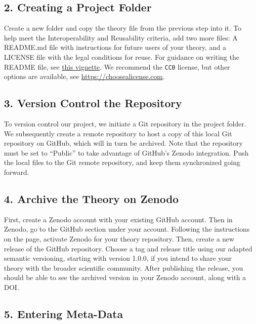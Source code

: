 \documentclass[
  man, noextraspace,floatsintext]{apa6}
\begin{document}
\subsection{2. Creating a Project Folder}\label{creating-a-project-folder}

Create a new folder and copy the theory file from the previous step into it.
To help meet the Interoperability and Reusability criteria,
add two more files:
A README.md file with instructions for future users of your theory,
and a LICENSE file with the legal conditions for reuse.
For guidance on writing the README file, see \href{https://cjvanlissa.github.io/theorytools/articles/readme.html}{this vignette}.
We recommend the \texttt{CC0} license, but other options are available, see \href{https://choosealicense.com/non-software/}{https://choosealicense.com}.

\subsection{3. Version Control the Repository}\label{version-control-the-repository}

To version control our project, we initiate a Git repository in the project folder.
We subsequently create a remote repository to host a copy of this local Git repository on GitHub, which will in turn be archived.
Note that the repository
must be set to ``Public'' to take advantage of GitHub's Zenodo integration.
Push the local files to the Git remote repository, and keep them synchronized going forward.

\subsection{4. Archive the Theory on Zenodo}\label{archive-the-theory-on-zenodo}

First, create a Zenodo account with your existing GitHub account.
Then in Zenodo, go to the GitHub section under your account.
Following the instructions on the page, activate Zenodo for your theory repository.
Then, create a new release of the GitHub repository.
Choose a tag and release title using our adapted semantic versioning, starting with version 1.0.0, if you intend to share your theory with the broader scientific community.
After publishing the release,
you should be able to see the archived version in your Zenodo account,
along with a DOI.

\subsection{5. Entering Meta-Data}\label{entering-meta-data}
\end{document}
